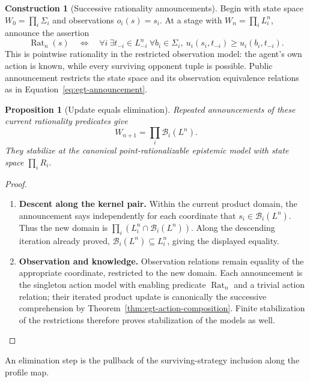 \documentclass[11pt,a4paper]{article}
\numberwithin{equation}{section}
\newtheorem{proposition}[theorem]{Proposition}
\theoremstyle{definition}
\newtheorem{construction}[construction]{Construction}
\theoremstyle{remark}
\theoremstyle{plain}
\begin{document}
\begin{construction}[Successive rationality announcements]
Begin with state
space $W_0=\prod_i\Sigma_i$ and observations $o_i(s)=s_i$.
At a stage with $W_n=\prod_iL_i^n$, announce the assertion
\[
 \operatorname{Rat}_n(s)\quad\Longleftrightarrow\quad
   \forall i\ \exists t_{-i}\in L_{-i}^n\ \forall b_i\in\Sigma_i,
       \ u_i(s_i,t_{-i})\geq u_i(b_i,t_{-i}).
\]
This is pointwise rationality in the restricted observation model:
the agent's own action is known, while every surviving opponent
tuple is possible. Public announcement restricts the state space
and its observation equivalence relations as in
Equation~\eqref{eq:egt-announcement}.
\end{construction}

\begin{proposition}[Update equals elimination]
\label{prop:egt-public-elimination}
Repeated announcements of these current rationality predicates give
\[
 W_{n+1}=\prod_i\mathcal B_i(L^n).
\]
They stabilize at the canonical point-rationalizable epistemic model
with state space $\prod_iR_i$.
\end{proposition}
\begin{proof}
\leavevmode
\begin{enumerate}[label=\textup{(\arabic*)},leftmargin=*,itemsep=4pt,topsep=3pt]
  \item \textbf{Descent along the kernel pair.} Within the current product domain, the announcement says independently
for each coordinate that $s_i\in\mathcal B_i(L^n)$. Thus the
new domain is $\prod_i(L_i^n\cap\mathcal B_i(L^n))$. Along the descending iteration already proved,
$\mathcal B_i(L^n)\subseteq L_i^n$, giving the displayed equality.
  \item \textbf{Observation and knowledge.} Observation relations remain equality of the appropriate coordinate,
restricted to the new domain. Each announcement is the singleton action
model with enabling predicate $\operatorname{Rat}_n$ and a trivial
action relation; their iterated product update is canonically the
successive comprehension by
Theorem~\ref{thm:egt-action-composition}. Finite stabilization of the
restrictions therefore proves stabilization of the models as well.
\end{enumerate}
\end{proof}

\noindent An elimination step is the pullback of the surviving-strategy inclusion along the profile map.
\begin{center}
\end{center}
\end{document}
